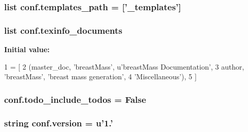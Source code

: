 \hypertarget{namespaceconf_ae850ae634911b713e036b43894fdd525}{
\subsubsection[{templates\-\_\-path}]{\setlength{\rightskip}{0pt plus 5cm}list conf.\-templates\-\_\-path = \mbox{[}'\-\_\-templates'\mbox{]}}}\label{namespaceconf_ae850ae634911b713e036b43894fdd525}
\hypertarget{namespaceconf_a54b0faed214ac92017d5689efbb10672}{
\subsubsection[{texinfo\-\_\-documents}]{\setlength{\rightskip}{0pt plus 5cm}list conf.\-texinfo\-\_\-documents}}\label{namespaceconf_a54b0faed214ac92017d5689efbb10672}
{\bfseries Initial value\-:}
\begin{DoxyCode}
1 = [
2     (master\_doc, \textcolor{stringliteral}{'breastMass'}, \textcolor{stringliteral}{u'breastMass Documentation'},
3      author, \textcolor{stringliteral}{'breastMass'}, \textcolor{stringliteral}{'breast mass generation'},
4      \textcolor{stringliteral}{'Miscellaneous'}),
5 ]
\end{DoxyCode}
\hypertarget{namespaceconf_a997cbdffcb2f28023aba4c37bbf469b5}{
\subsubsection[{todo\-\_\-include\-\_\-todos}]{\setlength{\rightskip}{0pt plus 5cm}conf.\-todo\-\_\-include\-\_\-todos = False}}\label{namespaceconf_a997cbdffcb2f28023aba4c37bbf469b5}
\hypertarget{namespaceconf_ade15c5b54093b64d7c428ec19ca5b1cb}{
\subsubsection[{version}]{\setlength{\rightskip}{0pt plus 5cm}string conf.\-version = u'1.'}}\label{namespaceconf_ade15c5b54093b64d7c428ec19ca5b1cb}
